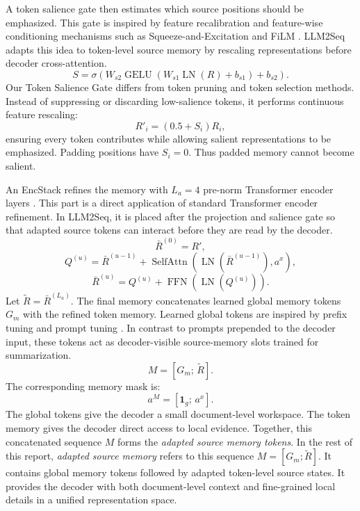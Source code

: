 \documentclass[11pt]{article}
\begin{document}
A token salience gate then estimates which source positions should be emphasized.
This gate is inspired by feature recalibration and feature-wise conditioning mechanisms such as Squeeze-and-Excitation and FiLM \citep{hu2018squeeze,perez2018film}.
LLM2Seq adapts this idea to token-level source memory by rescaling representations before decoder cross-attention.
\begin{equation}
S=\sigma(W_{s2}\operatorname{GELU}(W_{s1}\operatorname{LN}(R)+b_{s1})+b_{s2}).
\end{equation}
Our Token Salience Gate differs from token pruning and token selection methods.
Instead of suppressing or discarding low-salience tokens, it performs continuous feature rescaling:
\begin{equation}
R'_i=(0.5+S_i)R_i,
\end{equation}
ensuring every token contributes while allowing salient representations to be emphasized.
Padding positions have $S_i=0$.
Thus padded memory cannot become salient.

An EncStack refines the memory with $L_a=4$ pre-norm Transformer encoder layers \citep{vaswani2017attention}.
This part is a direct application of standard Transformer encoder refinement.
In LLM2Seq, it is placed after the projection and salience gate so that adapted source tokens can interact before they are read by the decoder.
\begin{equation}
\bar{R}^{(0)}=R',
\end{equation}
\begin{equation}
Q^{(u)}=\bar{R}^{(u-1)}
+\operatorname{SelfAttn}(\operatorname{LN}(\bar{R}^{(u-1)}),a^x),
\end{equation}
\begin{equation}
\bar{R}^{(u)}=Q^{(u)}
+\operatorname{FFN}(\operatorname{LN}(Q^{(u)})).
\end{equation}
Let $\tilde{R}=\bar{R}^{(L_a)}$.
The final memory concatenates learned global memory tokens $G_m$ with the refined token memory.
Learned global tokens are inspired by prefix tuning and prompt tuning \citep{li2021prefix,lester2021prompt}.
In contrast to prompts prepended to the decoder input, these tokens act as decoder-visible source-memory slots trained for summarization.
\begin{equation}
M=[G_m;\,\tilde{R}].
\end{equation}
The corresponding memory mask is:
\begin{equation}
a^M=[\mathbf{1}_g;\,a^x].
\end{equation}
The global tokens give the decoder a small document-level workspace.
The token memory gives the decoder direct access to local evidence.
Together, this concatenated sequence $M$ forms the \textit{adapted source memory tokens}.
In the rest of this report, \textit{adapted source memory} refers to this sequence $M=[G_m;\tilde{R}]$.
It contains global memory tokens followed by adapted token-level source states.
It provides the decoder with both document-level context and fine-grained local details in a unified representation space.
\end{document}
